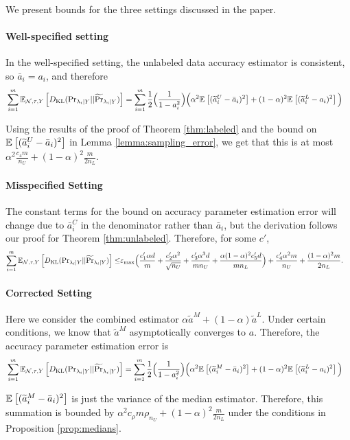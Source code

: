 We present bounds for the three settings discussed in the paper.

\paragraph{Well-specified setting} In the well-specified setting, the unlabeled data accuracy estimator is consistent, so $\bar{a}_i = a_i$, and therefore
\begin{align}
     &\sum_{i = 1}^m \mathbb{E}_{\mathcal{N}, \tau, Y}\left[D_{\mathrm{KL}} (\mathrm{Pr}_{\lambda_i | Y} || \widetilde{\Pr}_{\lambda_i | Y} )\right] =  \sum_{i = 1}^m \frac{1}{2} \Big( \frac{1}{1 - a_i^2} \Big) \Big(\alpha^2 \mathbb{E}_{}\left[(\widetilde{a}_i^U - \bar{a}_i)^2\right] + (1 - \alpha)^2 \mathbb{E}_{}\left[(\widetilde{a}_i^L - a_i)^2\right] \Big)    
\end{align}

Using the results of the proof of Theorem \ref{thm:labeled} and the bound on $\mathbb{E}_{}\left[(\widetilde{a}_i^U - \bar{a}_i)^2\right]$ in Lemma \ref{lemma:sampling_error}, we get that this is at most $\alpha^2 \frac{c_4 m }{n_U} + (1 - \alpha)^2 \frac{m}{2n_L}$.

\paragraph{Misspecified Setting} The constant terms for the bound on accuracy parameter estimation error will change due to $\bar{a}_i^C$ in the denominator rather than $\bar{a}_i$, but the derivation follows our proof for Theorem \ref{thm:unlabeled}. Therefore, for some $c'$,
\begin{align}
    \sum_{i = 1}^m \mathbb{E}_{\mathcal{N}, \tau, Y}\left[D_{\mathrm{KL}} (\mathrm{Pr}_{\lambda_i | Y} || \widetilde{\Pr}_{\lambda_i | Y} )\right] \le & \varepsilon_{\max}\Big(\frac{c'_1 \alpha d }{m} + \frac{c'_2 \alpha^2 }{\sqrt{n_U}} + \frac{c'_3 \alpha^3 d}{m n_U} + \frac{\alpha (1 - \alpha)^2 c'_5 d}{m n_L} \Big) + \frac{c'_4 \alpha^2 m}{n_U} + \frac{(1 - \alpha)^2 m}{2n_L}. \nonumber
\end{align}

\paragraph{Corrected Setting} Here we consider the combined estimator $\alpha \widetilde{a}^M + (1 - \alpha)\widetilde{a}^L$. Under certain conditions, we know that $\widetilde{a}^M$ asymptotically converges to $a$. Therefore, the accuracy parameter estimation error is
\begin{align}
     &\sum_{i = 1}^m \mathbb{E}_{\mathcal{N}, \tau, Y}\left[D_{\mathrm{KL}} (\mathrm{Pr}_{\lambda_i | Y} || \widetilde{\Pr}_{\lambda_i | Y} )\right] =  \sum_{i = 1}^m \frac{1}{2} \Big( \frac{1}{1 - a_i^2} \Big) \Big(\alpha^2 \mathbb{E}_{}\left[(\widetilde{a}_i^M - \bar{a}_i)^2\right] + (1 - \alpha)^2 \mathbb{E}_{}\left[(\widetilde{a}_i^L - a_i)^2\right] \Big)
\end{align}

$\mathbb{E}_{}\left[(\widetilde{a}_i^M - \bar{a}_i)^2\right]$ is just the variance of the median estimator. Therefore, this summation is bounded by $\alpha^2 c_{\rho} m \rho_{n_U} + (1 - \alpha)^2 \frac{m}{2n_L}$ under the conditions in Proposition \ref{prop:medians}.



